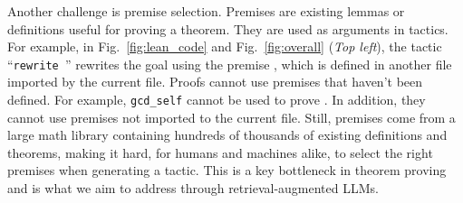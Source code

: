 Another challenge is premise selection. Premises are existing lemmas or definitions useful for proving a theorem. They are used as arguments in tactics. For example, in Fig.~\ref{fig:lean_code} and Fig.~\ref{fig:overall} (\emph{Top left}), the tactic ``\texttt{rewrite }'' rewrites the goal using the premise , which is defined in another file imported by the current file. Proofs cannot use premises that haven't been defined. For example, \texttt{gcd\_self} cannot be used to prove . In addition, they cannot use premises not imported to the current file. Still, premises come from a large math library containing hundreds of thousands of existing definitions and theorems, making it hard, for humans and machines alike, to select the right premises when generating a tactic. This is a key bottleneck in theorem proving and is what we aim to address through retrieval-augmented LLMs.


